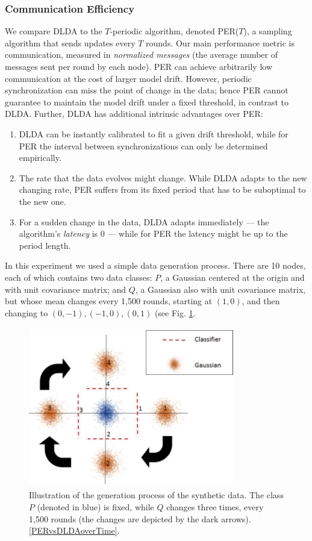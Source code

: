 \subsubsection{Communication Efficiency}\label{sec:com_eff}
We compare DLDA to the $T$-periodic algorithm, denoted
PER($T$), a sampling algorithm that sends updates
every $T$ rounds.
Our main performance metric is communication, measured in \textit{normalized messages} (the average number of messages sent per round by each node). 
PER can achieve arbitrarily low communication at the cost of larger model drift. However,
periodic synchronization can miss the point of change in the data; 
hence PER cannot guarantee to maintain the model drift under a fixed threshold, in contrast to DLDA.  Further,
DLDA has additional intrinsic advantages over PER: 
\begin{enumerate}
\item DLDA can be instantly calibrated to fit a given drift threshold, while for PER the 
interval between synchronizations can only be determined empirically. 
\item The rate that the data evolves might change. 
While DLDA adapts to the new changing rate, PER suffers from its fixed period
that has to be suboptimal to the new one.
\item For a sudden change in the data, DLDA adapts immediately --- the algorithm's
\textit{latency} is 0 --- while for PER the latency might be up to the period length.
\end{enumerate}

In this experiment we used a simple data generation process. There are 10 nodes, each of which contains two data classes: $P$, a Gaussian centered
at the origin and with unit covariance matrix; and $Q$, a Gaussian also
with unit covariance matrix, but whose mean changes every 1,500 rounds, starting at $(1,0)$, and then changing to $(0,-1), (-1,0), (0,1)$ (see 
Fig. \ref{DataShiftInEarlyDetection}.

\begin{figure}[ht]
\label{DataShiftInEarlyDetection}
	\centering
	\includegraphics[width=9cm, height=7cm]{graphics/LDA/DataShiftInEarlyDetection.jpg}
	\caption{Illustration of the generation process of the synthetic data.
	The class $P$ (denoted in blue) is fixed, while $Q$ changes three
	times, every 1,500 rounds (the changes are depicted by the dark arrows).
	\ref{PERvsDLDAoverTime}.}
	\label{DataShiftInEarlyDetection}
\end{figure}

